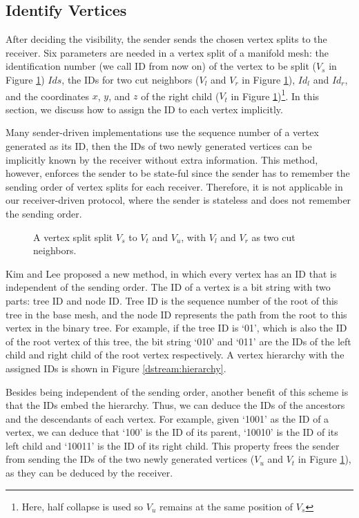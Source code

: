     \subsection{Identify Vertices}
    After deciding the visibility, the sender sends the chosen vertex splits to the receiver.
    Six parameters are needed in a vertex split of a manifold mesh: the identification number
    (we call ID from now on) of the vertex to be split
    ($V_s$ in Figure \ref{dstream:split}) $Ids$, 
    the IDs for two cut neighbors 
    ($V_l$ and $V_r$ in Figure \ref{dstream:split}), $Id_l$ and $Id_r$,
    and the coordinates $x$, $y$, and $z$ of the right child ($V_t$ in
    Figure \ref{dstream:split})\footnote{Here, half collapse is used so $V_u$ remains at the same position
    of $V_s$}. In this section, we discuss how to assign the ID to each vertex implicitly.
    
    Many sender-driven implementations use the sequence number of a vertex generated as its ID,
    then the IDs of two newly generated vertices can be implicitly known by the receiver without
    extra information. This method, however, 
    enforces the sender to be state-ful since the sender has to remember 
    the sending order of vertex splits for each receiver. 
    Therefore, it is not applicable in our receiver-driven protocol, where the sender is stateless and 
    does not remember the sending order. 
    \begin{figure}
    \centering
    \caption{A vertex split split $V_s$ to $V_t$ and $V_u$, with $V_l$ and $V_r$ as two cut neighbors.}
    \label{dstream:split}
    \end{figure}

    Kim and Lee \cite{kim01truly} proposed a new method, in which every vertex has
    an ID that is independent of the sending order. The ID of a vertex is a bit string
    with two parts: tree ID and node ID.
    Tree ID is the sequence number of the root of this tree in the base mesh, 
    and the node ID represents the path from the root to this vertex in the binary tree.
    For example, if the tree ID is `01', which is also the ID of
    the root vertex of this tree, the bit string `010' and `011' are the IDs
    of the left child and right child of the root vertex respectively. 
    A vertex hierarchy with the assigned IDs is shown in 
    Figure \ref{dstream:hierarchy}.

    Besides being independent of the sending order, another benefit of this scheme
    is that the IDs embed the hierarchy. Thus,  
    we can deduce the IDs of the ancestors and the descendants of each vertex. 
    For example, given `1001' as the ID of a vertex,
    we can deduce that `100' is the ID of its parent, `10010' is the ID of its left child and 
    `10011' is the ID of its right child. 
    This property frees the sender from sending the IDs of the two newly generated vertices
    ($V_u$ and $V_t$ in Figure \ref{dstream:split}), as they can be deduced by the receiver.

